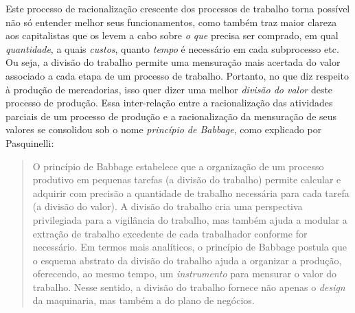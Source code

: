 Este processo de racionalização crescente dos processos de trabalho torna possível não só entender melhor seus funcionamentos, como também traz maior clareza aos capitalistas que os levem a cabo sobre \textit{o que} precisa ser comprado, em qual \textit{quantidade}, a quais \textit{custos}, quanto \textit{tempo} é necessário em cada subprocesso etc. Ou seja, a divisão do trabalho permite uma mensuração mais acertada do valor associado a cada etapa de um processo de trabalho. Portanto, no que diz respeito à produção de mercadorias, isso quer dizer uma melhor \textit{divisão do valor} deste processo de produção. Essa inter-relação entre a racionalização das atividades parciais de um processo de produção e a racionalização da mensuração de seus valores se consolidou sob o nome \textit{princípio de Babbage}, como explicado por Pasquinelli:
\begin{quote}
    O princípio de Babbage estabelece que a organização de um processo produtivo em pequenas tarefas (a divisão do trabalho) permite calcular e adquirir com precisão a quantidade de trabalho necessária para cada tarefa (a divisão do valor). A divisão do trabalho cria uma perspectiva privilegiada para a vigilância do trabalho, mas também ajuda a modular a extração de trabalho excedente de cada trabalhador conforme for necessário. Em termos mais analíticos, o princípio de Babbage postula que o esquema abstrato da divisão do trabalho ajuda a organizar a produção, oferecendo, ao mesmo tempo, um \textit{instrumento} para mensurar o valor do trabalho. Nesse sentido, a divisão do trabalho fornece não apenas o \textit{design} da maquinaria, mas também a do plano de negócios. \parencite[p. 63]{Pasquinelli2023}
\end{quote}


